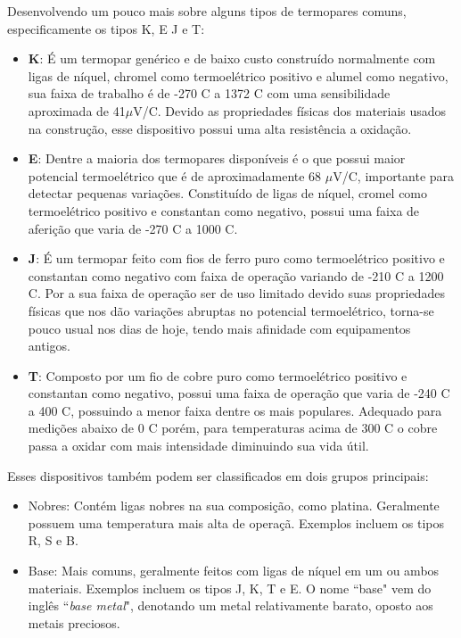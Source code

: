 \documentclass[a4paper,12pt]{report}
\begin{document}
	Desenvolvendo um pouco mais sobre alguns tipos de termopares comuns, especificamente os tipos K, E J e T:
	
	\begin{itemize}
		\item \textbf{K}: É um termopar genérico e de baixo custo construído normalmente com ligas de níquel, chromel como termoelétrico positivo e alumel como negativo, sua faixa de trabalho é de -270 \degree C a 1372 \degree C com uma sensibilidade aproximada de 41$\mu$V/\degree C. Devido as propriedades físicas dos materiais usados na construção, esse dispositivo possui uma alta resistência a oxidação.
		
		\item \textbf{E}: Dentre a maioria dos termopares disponíveis é o que possui maior potencial termoelétrico que é de aproximadamente 68 $\mu$V/\degree C, importante para detectar pequenas variações. Constituído de ligas de níquel, cromel como termoelétrico positivo e constantan como negativo, possui uma faixa de aferição que varia de -270 \degree C a 1000 \degree C.
				
		\item \textbf{J}: É um termopar feito com fios de ferro puro como termoelétrico positivo e constantan como negativo com faixa de operação variando de -210 \degree C a 1200 \degree C. Por a sua faixa de operação ser de uso limitado devido suas propriedades físicas que nos dão variações abruptas no potencial termoelétrico, torna-se pouco usual nos dias de hoje, tendo mais afinidade com equipamentos antigos.
		
		\item \textbf{T}: Composto por um fio de cobre puro como termoelétrico positivo e constantan como negativo, possui uma faixa de operação que varia de -240 \degree C a 400 \degree C, possuindo a menor faixa dentre os mais populares. Adequado para medições abaixo de 0 \degree C porém, para temperaturas acima de 300 \degree C o cobre passa a oxidar com mais intensidade diminuindo sua vida útil.
		
	\end{itemize}

	Esses dispositivos também podem ser classificados em dois grupos principais:
	
	\begin{itemize}
		\item Nobres: Contém ligas nobres na sua composição, como platina. Geralmente possuem uma temperatura mais alta de operaçã. Exemplos incluem os tipos R, S e B.
		\item Base: Mais comuns, geralmente feitos com ligas de níquel em um ou ambos materiais. Exemplos incluem os tipos J, K, T e E. O nome ``base" vem do inglês ``\textit{base metal}", denotando um metal relativamente barato, oposto aos metais preciosos.
	\end{itemize}
	
\end{document}

